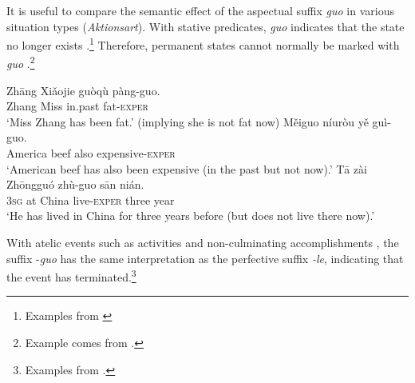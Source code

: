 \ea \label{ex:22.42}
\z \z


It is useful to compare the semantic effect of the aspectual suffix \textit{guo} in various situation types (\textit{Aktionsart}). With stative predicates, \textit{guo} indicates that the state no longer exists .\footnote{Examples from \citet[20, 23]{Ma1977}} Therefore, permanent states cannot normally be marked with \textit{guo} .\footnote{Example  comes from \citet[149]{XiaoMcEnery2004}.}


\ea \label{ex:22.43}
\ea \gll  Zhāng  Xiǎojie  guòqù  pàng-guo.\\
Zhang  Miss  in.past  fat-\textsc{exper}\\
\glt ‘Miss Zhang has been fat.’ (implying she is not fat now) 
\ex \gll Měiguo  níuròu  yě  guì-guo.\\
America  beef  also  expensive-\textsc{exper}\\
\glt ‘American beef has also been expensive (in the past but not now).’ 
\ex \gll  Tā  zài  Zhōngguó  zhù-guo  sān  nián.\\
\textsc{3sg}  at  China  live-\textsc{exper} three  year\\
\glt ‘He has lived in China for three years before (but does not live there now).’ 
\z \z

\z


With atelic events such as activities  and non-culminating accomplishments , the suffix -\textit{guo} has the same interpretation as the perfective suffix \textit{-le}, indicating that the event has terminated.\footnote{Examples from \citet[267]{Smith1997}.}


